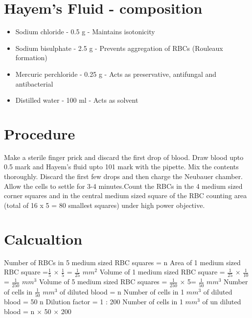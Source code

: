 \documentclass[a4paper,12pt]{book}
\begin{document}
		\section*{Hayem's Fluid - composition}
		\begin{itemize}

			\item{		Sodium chloride - 0.5 g	- Maintains isotonicity}
			\item{		Sodium bisulphate - 2.5 g - Prevents aggregation  of RBCs (Rouleaux formation)}
			\item{		Mercuric perchloride - 0.25 g - Acts  as preservative, antifungal and antibacterial}
			\item{		Distilled water - 100 ml - Acts as solvent}
		\end{itemize}


		\section*{Procedure}

Make  a  sterile  finger  prick  and  discard  the  first drop  of blood. Draw blood upto  0.5  mark  and  Hayem’s  fluid  upto 101  mark  with  the  pipette. Mix  the contents thoroughly. Discard  the  first  few  drops and then charge  the  Neubauer chamber. Allow  the cells to  settle  for  3-4  minutes.Count the RBCs in the 4 medium sized corner squares and  in the central medium sized square of the RBC counting area (total of 16 x 5 = 80 smallest squares) under high power objective.


\section*{Calcualtion}
Number of RBCs in 5 medium sized RBC squares = n\newline\vspace{.4cm}
Area of 1 medium  sized RBC square =$\frac{1}{5}$ $\times$ $\frac{1}{5}$ = $\frac{1}{25}$ $mm^2$\newline\vspace{.4cm}
Volume of 1 medium sized RBC square = $\frac{1}{25}$ $\times$ $\frac{1}{10}$ = $\frac{1}{250}$ $mm^3$\newline\vspace{.4cm}
Volume of 5 medium sized RBC squares = $\frac{1}{250}$ $\times$ 5= $\frac{1}{50}$ $mm^3$\newline\vspace{.4cm}
Number of cells in  $\frac{1}{50}$ $mm^3$ of diluted blood  = n\newline\vspace{.4cm}
Number of cells in  1 $mm^3$  of diluted blood = 50 n\newline\vspace{.4cm}
Dilution factor = 1 : 200\newline\vspace{.4cm}
Number of cells in 1 $mm^3$ of un diluted blood 	= n $\times$ 50 $\times$ 200  \newline\vspace{.4cm}
\end{document}

